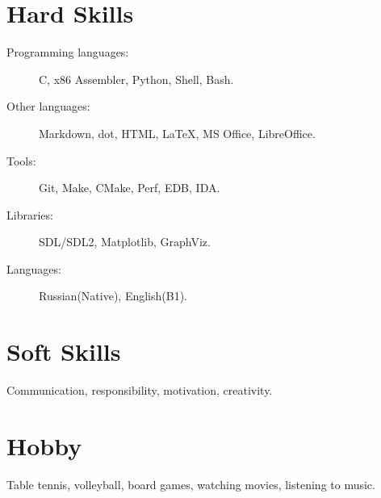 \documentclass[margin,line]{resume}
\begin{document}
\begin{resume}
       
    \section{\mysidestyle Hard Skills}
    \begin{description}
		\item[Programming languages:] C, x86 Assembler, Python, Shell, Bash.
            \item[Other languages:] Markdown, dot, HTML, \LaTeX, MS Office, LibreOffice. 
		\item[Tools:] Git, Make, CMake, Perf, EDB, IDA.
            \item[Libraries:] SDL/SDL2, Matplotlib, GraphViz.
            \item[Languages:] Russian(Native), English(B1).
    \end{description}

    \vspace{1pt}

    \section{\mysidestyle Soft Skills}
    Communication, responsibility, motivation, creativity.

    \section{\mysidestyle Hobby}
    Table tennis, volleyball, board games, watching movies, listening to music.
     
\end{resume}   
\end{document}
